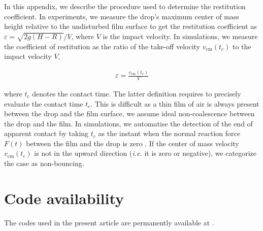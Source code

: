 \documentclass[]{jfm}
\begin{document}
In this appendix, we describe the procedure used to determine the restitution coefficient. 
In experiments, we measure the drop's maximum center of mass height relative to the undisturbed film surface to get the restitution coefficient as $\varepsilon = \sqrt{2g(H-R)}/V$, where $V$ is the impact velocity.  
In simulations, we measure the coefficient of restitution as the ratio of the take-off velocity $v_{\text{cm}}(t_c)$ to the impact velocity $V$,

\begin{align}
	\varepsilon = \frac{v_{\text{cm}}(t_c)}{V}
\end{align}

\noindent where $t_c$ denotes the contact time. 
The latter definition requires to precisely evaluate the contact time $t_c$.
This is difficult as a thin film of air is always present between the drop and the film surface, we assume ideal non-coalescence between the drop and the film.
In simulations, we automatise the detection of the end of apparent contact by taking $t_c$ as the instant when the normal reaction force $F(t)$ between the film and the drop is zero \citep[for details on the force calculation, see][]{zhang2022impact}.
If the center of mass velocity $v_{\text{cm}}(t_c)$ is not in the upward direction ({\it i.e.} it is zero or negative), we categorize the case as non-bouncing. 


\section{Code availability}
The codes used in the present article are permanently available at \citet{basiliskVatsalDropFilm}.



\end{document}
